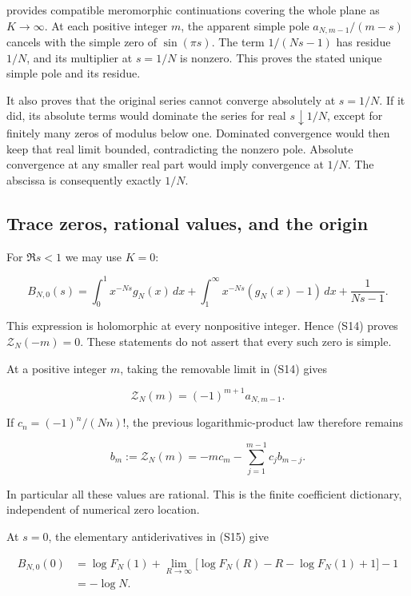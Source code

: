 provides compatible meromorphic continuations covering the whole plane
as \(K\to\infty\). At each positive integer \(m\), the apparent simple
pole \(a_{N,m-1}/(m-s)\) cancels with the simple zero of
\(\sin(\pi s)\). The term \(1/(Ns-1)\) has residue \(1/N\), and its
multiplier at \(s=1/N\) is nonzero. This proves the stated unique simple
pole and its residue.

It also proves that the original series cannot converge absolutely at
\(s=1/N\). If it did, its absolute terms would dominate the series for
real \(s\downarrow1/N\), except for finitely many zeros of modulus below
one. Dominated convergence would then keep that real limit bounded,
contradicting the nonzero pole. Absolute convergence at any smaller real
part would imply convergence at \(1/N\). The abscissa is consequently
exactly \(1/N\).

\hypertarget{trace-zeros-rational-values-and-the-origin}{%
\subsection{Trace zeros, rational values, and the
origin}\label{trace-zeros-rational-values-and-the-origin}}

For \(\Re s<1\) we may use \(K=0\):

\[
B_{N,0}(s)=\int_0^1x^{-Ns}g_N(x)\,dx
+\int_1^\infty x^{-Ns}(g_N(x)-1)\,dx+\frac1{Ns-1}.
\tag{S15}
\]

This expression is holomorphic at every nonpositive integer. Hence (S14)
proves \(\mathcal Z_N(-m)=0\). These statements do not assert that every
such zero is simple.

At a positive integer \(m\), taking the removable limit in (S14) gives

\[
\mathcal Z_N(m)=(-1)^{m+1}a_{N,m-1}.
\tag{S16}
\]

If \(c_n=(-1)^n/(Nn)!\), the previous logarithmic-product law therefore
remains

\[
b_m:=\mathcal Z_N(m)
=-m c_m-\sum_{j=1}^{m-1}c_jb_{m-j}.
\tag{S17}
\]

In particular all these values are rational. This is the finite
coefficient dictionary, independent of numerical zero location.

At \(s=0\), the elementary antiderivatives in (S15) give

\[
\begin{aligned}
B_{N,0}(0)
&=\log F_N(1)
 +\lim_{R\to\infty}\bigl[\log F_N(R)-R-\log F_N(1)+1\bigr]-1\\
&=-\log N.
\end{aligned}
\]

